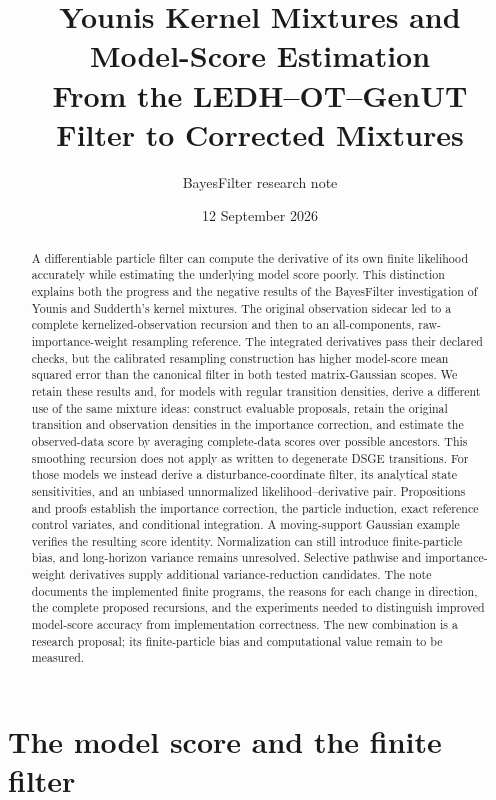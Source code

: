 \documentclass[11pt]{article}
\title{Younis Kernel Mixtures and Model-Score Estimation\\
From the LEDH--OT--GenUT Filter to Corrected Mixtures}
\author{BayesFilter research note}
\date{12 September 2026}
\begin{document}
\maketitle

\begin{abstract}
A differentiable particle filter can compute the derivative of its own
finite likelihood accurately while estimating the underlying model score
poorly. This distinction explains both the progress and the negative results
of the BayesFilter investigation of Younis and Sudderth's kernel mixtures.
The original observation sidecar led to a complete kernelized-observation
recursion and then to an all-components, raw-importance-weight resampling
reference. The integrated derivatives pass their declared checks, but the
calibrated resampling construction has higher model-score mean squared error
than the canonical filter in both tested matrix-Gaussian scopes. We retain
these results and, for models with regular transition densities, derive a
different use of the same mixture ideas: construct evaluable proposals,
retain the original transition and observation densities in the importance
correction, and estimate the observed-data score by averaging complete-data
scores over possible ancestors. This smoothing recursion does not apply as
written to degenerate DSGE transitions. For those models we instead derive
a disturbance-coordinate filter, its analytical state sensitivities, and an
unbiased unnormalized likelihood--derivative pair. Propositions and proofs
establish the importance correction, the particle induction, exact reference
control variates, and conditional integration. A moving-support Gaussian
example verifies the resulting score identity. Normalization can still
introduce finite-particle bias, and long-horizon variance remains unresolved.
Selective pathwise and importance-weight derivatives supply additional
variance-reduction candidates.
The note documents the implemented finite programs, the reasons for each
change in direction, the complete proposed recursions, and the experiments
needed to distinguish improved model-score accuracy from implementation
correctness. The new combination is a research proposal; its finite-particle
bias and computational value remain to be measured.
\end{abstract}
\clearpage
\tableofcontents
\clearpage

\section{The model score and the finite filter}
\label{sec:question}
\end{document}
